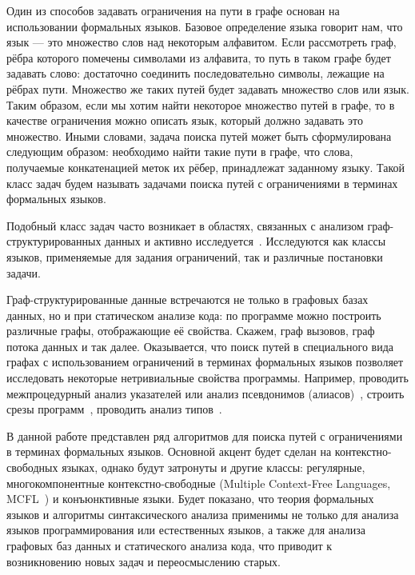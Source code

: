 Один из способов задавать ограничения на пути в графе основан на использовании формальных языков.
Базовое определение языка говорит нам, что язык --- это множество слов над некоторым алфавитом.
Если рассмотреть граф, рёбра которого помечены символами из алфавита, то путь в таком графе будет задавать слово: достаточно соединить последовательно символы, лежащие на рёбрах пути.
Множество же таких путей будет задавать множество слов или язык.
Таким образом, если мы хотим найти некоторое множество путей в графе, то в качестве ограничения можно описать язык, который должно задавать это множество.
Иными словами, задача поиска путей может быть сформулирована следующим образом: необходимо найти такие пути в графе, что слова, получаемые конкатенацией меток их рёбер, принадлежат заданному языку.
Такой класс задач будем называть задачами поиска путей с ограничениями в терминах формальных языков.

Подобный класс задач часто возникает в областях, связанных с анализом граф-структурированных данных и активно исследуется~\cite{doi:10.1137/S0097539798337716,axelsson2011formal,10.1007/978-3-642-22321-1_24,Ward:2010:CRL:1710158.1710234,barrett2007label,doi:10.1137/S0097539798337716}.
Исследуются как классы языков, применяемые для задания ограничений, так и различные постановки задачи.

Граф-структурированные данные встречаются не только в графовых базах данных, но и при статическом анализе кода: по программе можно построить различные графы, отображающие её свойства.
Скажем, граф вызовов, граф потока данных и так далее.
Оказывается, что поиск путей в специального вида графах с использованием ограничений в терминах формальных языков позволяет исследовать некоторые нетривиальные свойства программы.
Например, проводить межпроцедурный анализ указателей или анализ псевдонимов (алиасов)~\cite{Zheng,10.1145/2001420.2001440,10.1145/2714064.2660213}, строить срезы программ~\cite{10.1145/193173.195287}, проводить анализ типов~\cite{10.1145/373243.360208}.

В данной работе представлен ряд алгоритмов для поиска путей с ограничениями в терминах формальных языков.
Основной акцент будет сделан на контекстно-свободных языках, однако будут затронуты и другие классы: регулярные, многокомпонентные контекстно-свободные (Multiple Context-Free Languages, MCFL~\cite{SEKI1991191}) и конъюнктивные языки.
Будет показано, что теория формальных языков и алгоритмы синтаксического анализа применимы не только для анализа языков программирования или естественных языков, а также для анализа графовых баз данных и статического анализа кода, что приводит к возникновению новых задач и переосмыслению старых.


